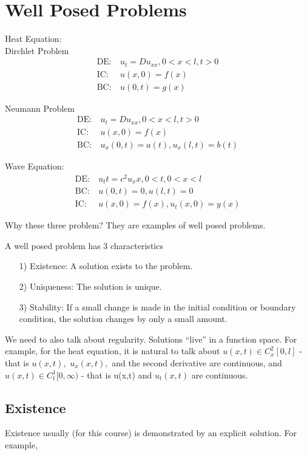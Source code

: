 \documentclass{article}
\begin{document}
\section{Well Posed Problems}
Heat Equation:\\

Dirchlet Problem
\begin{align*}
\text{DE:}&~ u_t = Du_{xx} , 0< x < l, t > 0\\
\text{IC:}&~ u(x,0) = f(x) \tag{D}\\
\text{BC:}&~ u(0,t) = g(x)
\end{align*}

Neumann Problem
\begin{align*}
\text{DE:}&~ u_t = Du_{xx}, 0 < x < l, t > 0\\
\text{IC:}&~ u(x,0) = f(x) \tag{N}\\
\text{BC:}&~ u_x(0,t) = a(t), u_x(l,t) = b(t)
\end{align*}

Wave Equation:
\begin{align*}
\text{DE:}&~ u_tt = c^2 u_xx, 0 < t, 0 < x < l\\
\text{BC:}&~ u(0,t) = 0, u(l,t) = 0 \tag{W}\\
\text{IC:}&~ u(x,0) = f(x), u_t(x,0) = y(x)
\end{align*}

Why these three problem? They are examples of well posed problems.

A well posed problem has 3 characteristics
\begin{enumerate}
	\item[1)] Existence: A solution exists to the problem.
	\item[2)] Uniqueness: The solution is unique.
	\item[3)] Stability: If a small change is made in the initial condition or boundary condition, the solution changes by only a small amount.
\end{enumerate}

We need to also talk about regularity. Solutions ``live'' in a function space. For example, for the heat equation, it is natural to talk about $u(x,t) \in C_x^2[0,l]$ - that is $u(x,t),$ $u_x(x,t),$ and the second derivative are continuous, and $u(x,t) \in C_t^1[0,\infty)$ - that is u(x,t) and $u_t(x,t)$ are continuous.

\subsection{Existence}
Existence usually (for this course) is demonstrated by an explicit solution. For example,
\end{document}

